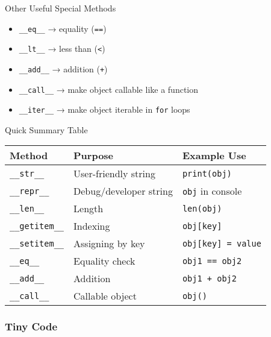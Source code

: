 \documentclass[
  letterpaper,
  DIV=11,
  numbers=noendperiod]{scrreprt}
\providecommand{\tightlist}{%
  \setlength{\itemsep}{0pt}\setlength{\parskip}{0pt}}
\begin{document}
Other Useful Special Methods

\begin{itemize}
\tightlist
\item
  \texttt{\_\_eq\_\_} → equality (\texttt{==})
\item
  \texttt{\_\_lt\_\_} → less than (\texttt{\textless{}})
\item
  \texttt{\_\_add\_\_} → addition (\texttt{+})
\item
  \texttt{\_\_call\_\_} → make object callable like a function
\item
  \texttt{\_\_iter\_\_} → make object iterable in \texttt{for} loops
\end{itemize}

Quick Summary Table

\begin{longtable}[]{@{}lll@{}}
\toprule\noalign{}
Method & Purpose & Example Use \\
\midrule\noalign{}
\endhead
\bottomrule\noalign{}
\endlastfoot
\texttt{\_\_str\_\_} & User-friendly string & \texttt{print(obj)} \\
\texttt{\_\_repr\_\_} & Debug/developer string & \texttt{obj} in
console \\
\texttt{\_\_len\_\_} & Length & \texttt{len(obj)} \\
\texttt{\_\_getitem\_\_} & Indexing & \texttt{obj{[}key{]}} \\
\texttt{\_\_setitem\_\_} & Assigning by key &
\texttt{obj{[}key{]}\ =\ value} \\
\texttt{\_\_eq\_\_} & Equality check & \texttt{obj1\ ==\ obj2} \\
\texttt{\_\_add\_\_} & Addition & \texttt{obj1\ +\ obj2} \\
\texttt{\_\_call\_\_} & Callable object & \texttt{obj()} \\
\end{longtable}

\subsubsection{Tiny Code}\label{tiny-code-68}
\end{document}
